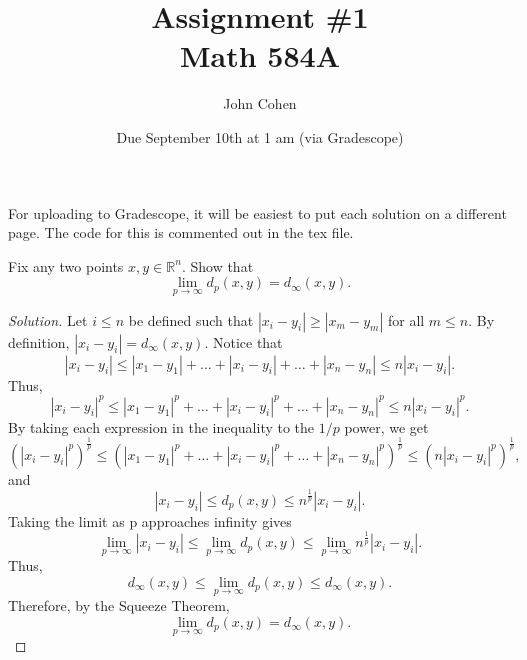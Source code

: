\documentclass[11pt,letterpaper]{article}
\title{Assignment \#1\\Math 584A}
\author{
	John Cohen
	}
\date{Due September 10th at 1 am (via Gradescope)}
\newcommand{\R}{\mathbb{R}}
\newenvironment{prob}[1]
  {\renewcommand\theinnerprob{#1}\innerprob}
  {\endinnerprob}
\newenvironment{solution}
  {\renewcommand\qedsymbol{}\begin{proof}[Solution]}
  {\end{proof}\bigskip}
\begin{document}
\maketitle

For uploading to Gradescope, it will be easiest to put each solution on a different page.  The code for this is commented out in the tex file.








\begin{prob}{1}  %
Fix any two points $x,y\in \R^n$.  Show that
\[
	\lim_{p\to\infty} d_p(x,y) = d_\infty(x,y).
\]
\end{prob}
\begin{solution}
	Let $i\leq n$ be defined such that $|x_i-y_i| \geq |x_m-y_m|$ for all $m\leq n$. By definition, $|x_i-y_i| = d_\infty(x,y)$. Notice that $$|x_i-y_i| \leq |x_1-y_1| + \dotsc + |x_i-y_i|+ \dotsc + |x_n-y_n|\leq n|x_i-y_i|.$$ Thus, $$|x_i-y_i|^p \leq |x_1-y_1|^p + \dotsc + |x_i-y_i|^p+ \dotsc + |x_n-y_n|^p\leq n|x_i-y_i|^p.$$ By taking each expression in the inequality to the $1/p$ power, we get $$(|x_i-y_i|^p)^{\frac{1}{p}} \leq (|x_1-y_1|^p + \dotsc + |x_i-y_i|^p+ \dotsc +|x_n-y_n|^p)^{\frac{1}{p}} \leq (n|x_i-y_i|^p)^{\frac{1}{p}},$$ and
	\begin{equation}\label{e1}
		|x_i-y_i| \leq d_p(x,y) \leq n^\frac{1}{p}|x_i-y_i|.
	\end{equation}  
	Taking the limit as p approaches infinity gives $$\lim_{p\to\infty}|x_i-y_i| \leq \lim_{p\to\infty}d_p(x,y) \leq \lim_{p\to\infty}n^\frac{1}{p}|x_i-y_i|.$$ Thus, $$d_\infty(x,y) \leq \lim_{p\to\infty}d_p(x,y) \leq d_\infty(x,y).$$ Therefore, by the Squeeze Theorem,
	\[
	\lim_{p\to\infty} d_p(x,y) = d_\infty(x,y).
	\]
\end{solution}
\newpage
\end{document}
